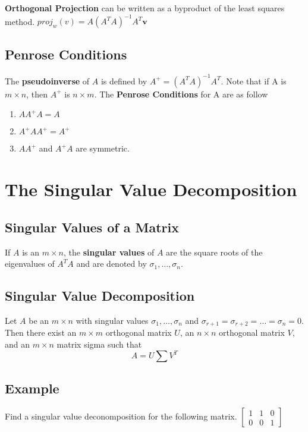 \textbf{Orthogonal Projection} can be written as a byproduct of the least squares method. 
$proj_w(v) = A(A^TA)^{-1}A^T\textbf{v}$
\subsection{Penrose Conditions}
The \textbf{pseudoinverse} of $A$ is defined by $A^+ = (A^TA)^{-1}A^T$.
Note that if A is $m\times n$, then $A^+$ is $n\times m$.
The \textbf{Penrose Conditions} for A are as follow
\begin{enumerate}
    \item $AA^+A = A$
    \item $A^+AA^+ = A^+$
    \item $AA^+$ and $A^+A$ are symmetric.
\end{enumerate}

\section{The Singular Value Decomposition}

\subsection{Singular Values of a Matrix}
If $A$ is an $m\times n$, the \textbf{singular values} of $A$ are the square roots of the eigenvalues of $A^TA$ and are denoted by $\sigma_1,\dots, \sigma_n$.
\subsection{Singular Value Decomposition}
Let $A$ be an $m\times n$ with singular values $\sigma_1,\dots, \sigma_n$ and $\sigma_{r+1} = \sigma_{r+2} = \dots = \sigma_n = 0$. Then there exist an $m\times m$ orthogonal matrix $U$, 
an $n\times n$ orthogonal matrix $V$, and an $m\times n$ matrix sigma such that
$$A = U\sum V^T$$

\subsection*{Example}
Find a singular value deconomposition for the following matrix. 
$\begin{bmatrix}
    1 & 1 & 0\\0&0&1
\end{bmatrix}$
